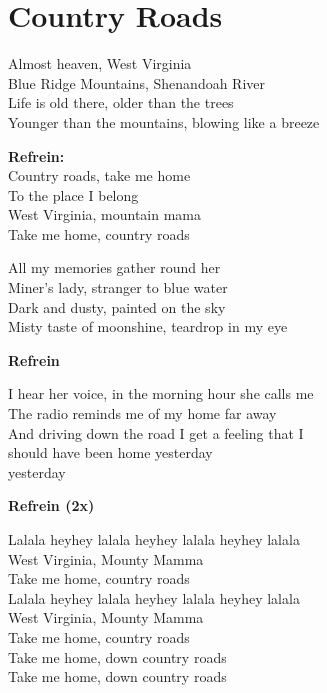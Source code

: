 \section{Country Roads}
Almost heaven, West Virginia \\
Blue Ridge Mountains, Shenandoah River\\
Life is old there, older than the trees\\
Younger than the mountains, blowing like a breeze

\textbf{Refrein:}\\
Country roads, take me home\\
To the place I belong\\
West Virginia, mountain mama\\
Take me home, country roads

All my memories gather round her\\
Miner's lady, stranger to blue water\\
Dark and dusty, painted on the sky\\
Misty taste of moonshine, teardrop in my eye

\textbf{Refrein}

I hear her voice, in the morning hour she calls me\\
The radio reminds me of my home far away\\
And driving down the road I get a feeling that I\\
should have been home yesterday\\
yesterday

\textbf{Refrein (2x)}

Lalala heyhey lalala heyhey lalala heyhey lalala\\
West Virginia, Mounty Mamma\\
Take me home, country roads\\
Lalala heyhey lalala heyhey lalala heyhey lalala\\
West Virginia, Mounty Mamma\\
Take me home, country roads\\

Take me home, down country roads\\
Take me home, down country roads

